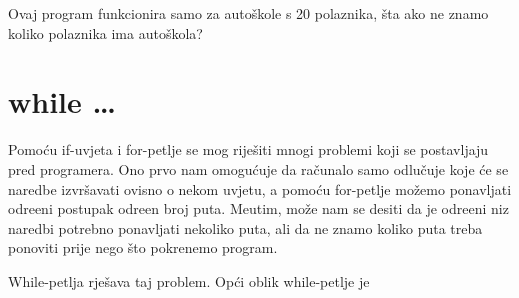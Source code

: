 Ovaj program funkcionira samo za auto\v{s}kole s 20 polaznika, \v{s}ta ako ne znamo
koliko polaznika ima auto\v{s}kola?


\section{while \dots}

Pomo\'{c}u if-uvjeta i for-petlje se mog rije\v{s}iti mnogi problemi koji se
postavljaju pred programera. Ono prvo nam omogu\'{c}uje da ra\v{c}unalo samo
odlu\v{c}uje koje \'{c}e se naredbe izvr\v{s}avati ovisno o nekom uvjetu, a
pomo\'{c}u for-petlje mo\v{z}emo ponavljati odre\dj{}eni postupak odre\dj{}en broj
puta. Me\dj{}utim, mo\v{z}e nam se desiti da je odre\dj{}eni niz naredbi potrebno
ponavljati nekoliko puta, ali da ne znamo koliko puta treba ponoviti prije nego
\v{s}to pokrenemo program. 

While-petlja rje\v{s}ava taj problem. Op\'{c}i oblik while-petlje je


